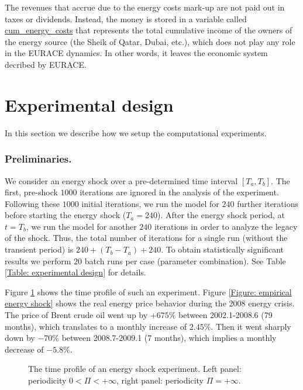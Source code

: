 The revenues that accrue due to the energy costs mark-up are not paid out in
taxes or dividends. Instead, the money is stored in a variable called %
\url{cum_energy_costs} that represents the total cumulative income of the
owners of the energy source (the Sheik of Qatar, Dubai, etc.), which does
not play any role in the EURACE dynamics. In other words, it leaves the
economic system decribed by EURACE.

\section{Experimental design}

In this section we describe how we setup the computational experiments.

\subsubsection*{Preliminaries.}

\bigskip We consider an energy shock over a pre-determined time interval $%
\left[ T_{a},T_{b}\right]$. The first, pre-shock $1000$ iterations are
ignored in the analysis of the experiment. Following these $1000$ initial
iterations, we run the model for $240$ further iterations before starting
the energy shock ($T_{a}=240$). After the energy shock period, at $t=T_{b}$,
we run the model for another $240$ iterations in order to analyze the legacy
of the shock. Thus, the total number of iterations for a single run (without
the transient period) is $240+(T_{b}-T_{a})+240$. To obtain statistically
significant results we perform $20$ batch runs per case (parameter
combination). See Table \ref{Table: experimental design} for details.

Figure \ref{Figure: energy shock} shows the time profile of such an
experiment. Figure \ref{Figure: empirical energy shock} shows the real
energy price behavior during the 2008 energy crisis. The price of Brent
crude oil went up by $+675\%$ between 2002.1-2008.6 (79 months), which
translates to a monthly increase of $2.45\%$. Then it went sharply down by $%
-70\%$ between 2008.7-2009.1 (7 months), which implies a monthly decrease of
$-5.8\%$.

\begin{figure}[th]
\centering\leavevmode
\begin{boxedminipage}{15cm}
\centering\leavevmode
\resizebox{7cm}{7cm}{}
\resizebox{7cm}{7cm}{}
\end{boxedminipage}
\caption{The time profile of an energy shock experiment. Left panel:
periodicity $0<\Pi<+\infty $, right panel: periodicity $\Pi=+\infty $.}
\label{Figure: energy shock}
\end{figure}

